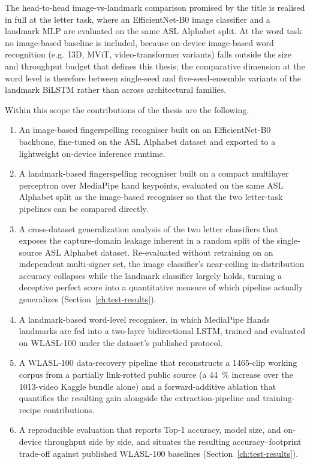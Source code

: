 The head-to-head image-vs-landmark comparison promised by the title
is realised in full at the letter task, where an EfficientNet-B0
image classifier and a landmark MLP are evaluated on the same
ASL Alphabet split. At the word task no image-based baseline is
included, because on-device image-based word recognition
(e.g.\ I3D, MViT, video-transformer variants) falls outside the
size and throughput budget that defines this thesis; the
comparative dimension at the word level is therefore between
single-seed and five-seed-ensemble variants of the landmark
BiLSTM rather than across architectural families.

Within this scope the contributions of the thesis are the following.

\begin{enumerate}
  \item An image-based fingerspelling recogniser built on an
        EfficientNet-B0 backbone, fine-tuned on the ASL Alphabet
        dataset and exported to a lightweight on-device inference
        runtime.
  \item A landmark-based fingerspelling recogniser built on a
        compact multilayer perceptron over MediaPipe hand keypoints,
        evaluated on the same ASL Alphabet split as the image-based
        recogniser so that the two letter-task pipelines can be
        compared directly.
  \item A cross-dataset generalization analysis of the two letter
        classifiers that exposes the capture-domain leakage inherent
        in a random split of the single-source ASL Alphabet dataset.
        Re-evaluated without retraining on an independent multi-signer
        set, the image classifier's near-ceiling in-distribution
        accuracy collapses while the landmark classifier largely
        holds, turning a deceptive perfect score into a quantitative
        measure of which pipeline actually generalizes
        (Section~\ref{ch:test-results}).
  \item A landmark-based word-level recogniser, in which MediaPipe
        Hands landmarks are fed into a two-layer bidirectional LSTM,
        trained and evaluated on WLASL-100 under the dataset's
        published protocol.
  \item A WLASL-100 data-recovery pipeline that reconstructs
        a \num{1465}-clip working corpus from a partially link-rotted
        public source (a \SI{44}{\percent} increase over the
        \num{1013}-video Kaggle bundle alone) and a forward-additive
        ablation that quantifies the resulting gain alongside the
        extraction-pipeline and training-recipe contributions.
  \item A reproducible evaluation that reports Top-1 accuracy, model
        size, and on-device throughput side by side, and situates the
        resulting accuracy--footprint trade-off against published
        WLASL-100 baselines
        (Section~\ref{ch:test-results}).
\end{enumerate}

